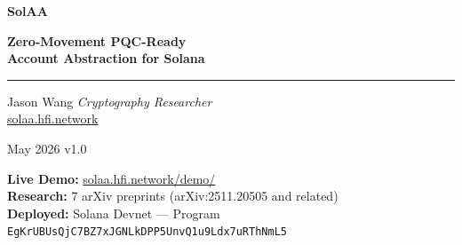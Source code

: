 \documentclass[11pt, a4paper]{article}
\begin{document}
\begin{titlepage}
  \centering
  \vspace*{2cm}

  {\Huge\bfseries\color{solana-purple} Sol\color{solana-green}AA}

  \vspace{0.75cm}
  {\LARGE\bfseries Zero-Movement PQC-Ready\\Account Abstraction for Solana}

  \vspace{0.5cm}
  \rule{0.6\linewidth}{0.4pt}

  \vspace{1cm}
  {\large Jason Wang \quad \textit{Cryptography Researcher}}\\[0.3em]
  {\color{text-muted}\small \href{https://solaa.hfi.network}{solaa.hfi.network}}

  \vspace{0.75cm}
  {\color{text-muted} May 2026 \quad v1.0}

  \vspace{2cm}

  \begin{abstract}
    \noindent
    SolAA is a production-ready account abstraction framework for Solana that delivers
    three capabilities simultaneously: \textbf{(1)} zero-movement key migration to
    post-quantum cryptography (ML-DSA-44), \textbf{(2)} ZK-proof-authorized smart account
    execution without Ed25519 signatures, and \textbf{(3)} trustless cross-chain ownership
    proofs without bridges. Unlike every prior account abstraction proposal, SolAA requires
    zero asset movement, zero new wallet creation, and zero transaction cost for the security
    upgrade itself. The entire \$200B+ Solana ecosystem is addressable on day one. This paper
    describes the protocol design, on-chain architecture, cryptographic foundations, and
    business rationale.
  \end{abstract}

  \vfill

  \begin{calloutbox}
    \textbf{Live Demo:} \href{https://solaa.hfi.network/demo/}{solaa.hfi.network/demo/}\\
    \textbf{Research:} 7 arXiv preprints (arXiv:2511.20505 and related)\\
    \textbf{Deployed:} Solana Devnet --- Program \texttt{EgKrUBUsQjC7BZ7xJGNLkDPP5UnvQ1u9Ldx7uRThNmL5}
  \end{calloutbox}
\end{titlepage}
\end{document}
